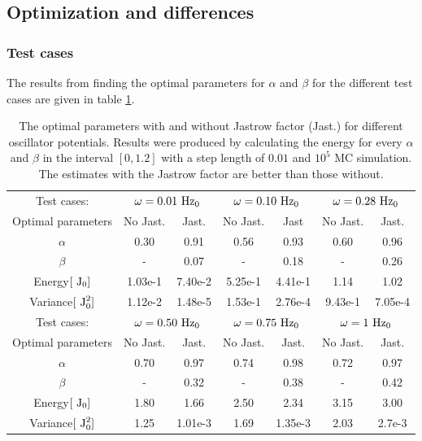 \subsection{Optimization and differences} \label{sec:res_opt_and_diff}

\subsubsection{Test cases} \label{sec:res_test_cases}

The results from finding the optimal parameters for $\alpha$ and $\beta$ for the different test cases are given in table \ref{tab:test_cases}.

\begin{table}[h!]
	\centering 
	\begin{tabular}{c  c c  c  c  c  c }
	\toprule
	 Test cases: 			& \multicolumn{2}{c}{$\omega=0.01 ~\textrm{Hz}_0$} & \multicolumn{2}{c}{$\omega=0.10 ~\textrm{Hz}_0$} & \multicolumn{2}{c}{$\omega=0.28 ~\textrm{Hz}_0$} \\
	 Optimal parameters  & No Jast. & 	Jast. & 	No Jast. & 	Jast &		No Jast. & 	Jast. \\
	 \midrule
	 $\alpha$& 				0.30 & 		0.91 & 		0.56	&	0.93	&	0.60 & 		0.96 		\\
	 $\beta$ & 				- & 		0.07 & 		-		&	0.18	&	- & 		0.26 	\\
	 \midrule
	 Energy$[~\textrm{J}_0]$ &		1.03e-1 &	7.40e-2 &	5.25e-1	&	4.41e-1	&	1.14  &		1.02 \\
	 Variance$[~\textrm{J}_0^2]$ &	1.12e-2 &	1.48e-5	& 	1.53e-1	&	2.76e-4	&	9.43e-1 & 	7.05e-4 	\\
	\bottomrule
	\toprule
	 Test cases: 			& \multicolumn{2}{c}{$\omega=0.50 ~\textrm{Hz}_0$} & \multicolumn{2}{c}{$\omega=0.75 ~\textrm{Hz}_0$} & \multicolumn{2}{c}{$\omega=1 ~\textrm{Hz}_0$} \\
	 Optimal parameters  & No Jast. & 	Jast. & 	No Jast. & 	Jast. & 	No Jast. & Jast. \\
	 \midrule
	 $\alpha$& 				0.70 & 		0.97 & 		0.74 & 		0.98 	& 	0.72	& 	0.97 	\\
	 $\beta$ & 				- & 		0.32 & 		- & 		0.38 & 		-  		& 	0.42 	\\
	 \midrule
	 Energy$[~\textrm{J}_0]$  & 		1.80 &		1.66 &		2.50  &		2.34 & 		3.15 & 		3.00	\\
	 Variance$[~\textrm{J}_0^2]$ & 	1.25 &		1.01e-3	& 	1.69 & 		1.35e-3 & 	2.03 & 		2.7e-3 	\\
	 \bottomrule
	\end{tabular}
	\caption{The optimal parameters with and without Jastrow factor (Jast.) for different oscillator
			 potentials.
			 Results were produced by calculating the energy for every $\alpha$ and $\beta$ in the interval $[0,1.2]$ with 	a step length of $0.01$ and $10^5$ MC simulation.
			 The estimates with the Jastrow factor are better than those without.}
	\label{tab:test_cases}
\end{table}

